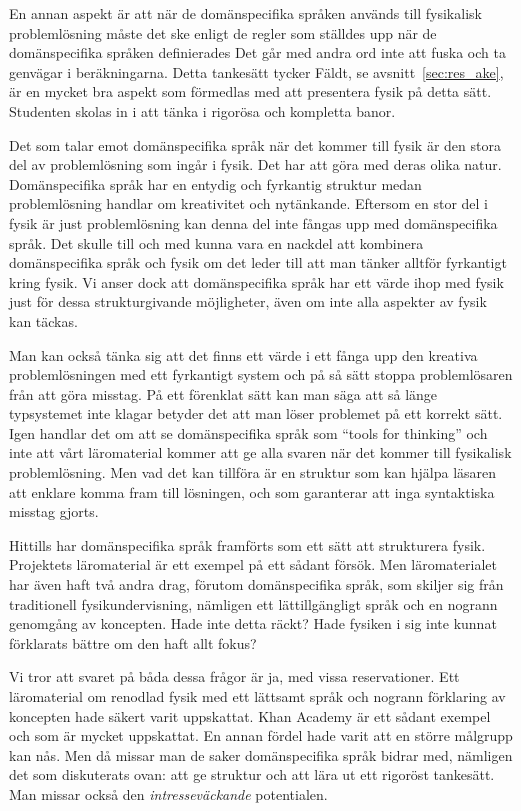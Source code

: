 En annan aspekt är att när de domänspecifika språken används till fysikalisk
problemlösning måste det ske enligt de regler som ställdes upp när de
domänspecifika språken definierades Det går med andra ord inte att fuska och ta
genvägar i beräkningarna. Detta tankesätt tycker Fäldt, se
avsnitt~\ref{sec:res_ake}, är en mycket bra aspekt som förmedlas med att
presentera fysik på detta sätt. Studenten skolas in i att tänka i rigorösa och
kompletta banor.

Det som talar emot
domänspecifika språk när det kommer till fysik är den stora del av problemlösning
som ingår i fysik. Det har att göra med deras olika natur. Domänspecifika språk
har en entydig och fyrkantig struktur medan problemlösning handlar om
kreativitet och nytänkande. Eftersom en stor del i fysik är just problemlösning
kan denna del inte fångas upp med domänspecifika språk. Det skulle till och med
kunna vara en nackdel att kombinera domänspecifika språk och fysik om det leder
till att man tänker alltför fyrkantigt kring fysik. Vi anser dock att
domänspecifika språk har ett värde ihop med fysik just för dessa strukturgivande
möjligheter, även om inte alla aspekter av fysik kan täckas. 

Man kan också
tänka sig att det finns ett värde i ett fånga upp den kreativa problemlösningen
med ett fyrkantigt system och på så sätt stoppa problemlösaren från att göra
misstag. På ett förenklat sätt kan man säga att så länge typsystemet inte klagar
betyder det att man löser problemet på ett korrekt sätt. Igen handlar det om att se
domänspecifika språk som ``tools for thinking'' och inte att vårt
läromaterial kommer att ge alla svaren när det kommer till fysikalisk
problemlösning. Men vad det kan tillföra är en struktur som kan hjälpa
läsaren att enklare komma fram till lösningen, och som garanterar att inga
syntaktiska misstag gjorts.

Hittills har domänspecifika språk framförts som ett sätt att strukturera fysik.
Projektets läromaterial är ett exempel på ett sådant försök. Men läromaterialet
har även haft två andra drag, förutom domänspecifika språk, som skiljer sig från
traditionell fysikundervisning, nämligen ett lättillgängligt språk och en
nogrann genomgång av koncepten. Hade inte detta räckt? Hade fysiken i sig inte
kunnat förklarats bättre om den haft allt fokus?

Vi tror att svaret på båda dessa frågor är ja, med vissa reservationer. Ett
läromaterial om renodlad fysik med ett lättsamt språk och nogrann förklaring av
koncepten hade säkert varit uppskattat. Khan Academy är ett sådant
exempel~\cite{khan} och som är mycket uppskattat. En annan fördel hade varit att en större målgrupp kan nås.
Men då missar man de saker domänspecifika språk bidrar med, nämligen det som
diskuterats ovan: att ge struktur och att lära ut ett rigoröst tankesätt. Man
missar också den \textit{intresseväckande} potentialen.

